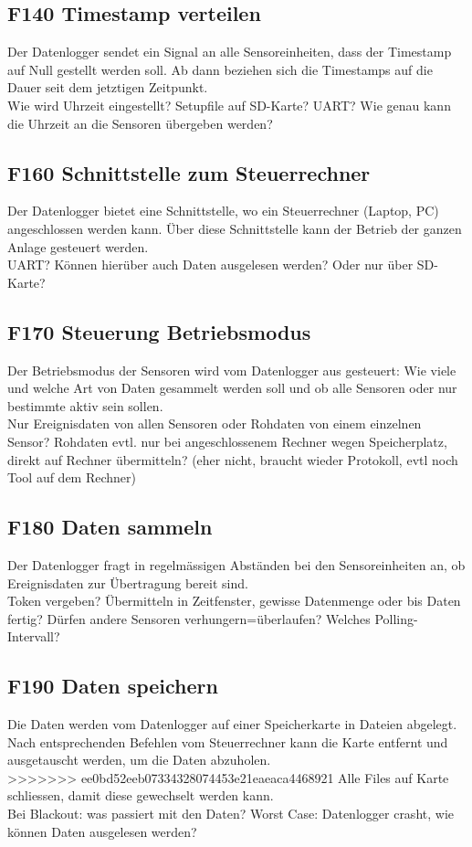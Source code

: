 \subsection{F140 Timestamp verteilen}
Der Datenlogger sendet ein Signal an alle Sensoreinheiten, dass der Timestamp auf Null gestellt werden soll. Ab dann beziehen sich die Timestamps auf die Dauer seit dem jetztigen Zeitpunkt.\\
Wie wird Uhrzeit eingestellt? Setupfile auf SD-Karte? UART? Wie genau kann die Uhrzeit an die Sensoren übergeben werden?

\subsection{F160 Schnittstelle zum Steuerrechner}
Der Datenlogger bietet eine Schnittstelle, wo ein Steuerrechner (Laptop, PC) angeschlossen werden kann. Über diese Schnittstelle kann der Betrieb der ganzen Anlage gesteuert werden.\\
 UART? Können hierüber auch Daten ausgelesen werden? Oder nur über SD-Karte?

\subsection{F170 Steuerung Betriebsmodus}
Der Betriebsmodus der Sensoren wird vom Datenlogger aus gesteuert: Wie viele und welche Art von Daten gesammelt werden soll und ob alle Sensoren oder nur bestimmte aktiv sein sollen. \\
Nur Ereignisdaten von allen Sensoren oder Rohdaten von einem einzelnen Sensor? Rohdaten evtl. nur bei angeschlossenem Rechner wegen Speicherplatz, direkt auf Rechner übermitteln? (eher nicht, braucht wieder Protokoll, evtl noch Tool auf dem Rechner)

\subsection{F180 Daten sammeln}
Der Datenlogger fragt in regelmässigen Abständen bei den Sensoreinheiten an, ob Ereignisdaten zur Übertragung bereit sind.\\
Token vergeben? Übermitteln in Zeitfenster, gewisse Datenmenge oder bis Daten fertig? Dürfen andere Sensoren verhungern=überlaufen? Welches Polling-Intervall?

\subsection{F190 Daten speichern}
Die Daten werden vom Datenlogger auf einer Speicherkarte in Dateien abgelegt. Nach entsprechenden Befehlen vom Steuerrechner kann die Karte entfernt und ausgetauscht werden, um die Daten abzuholen.\\
>>>>>>> ee0bd52eeb07334328074453e21eaeaca4468921
Alle Files auf Karte schliessen, damit diese gewechselt werden kann.\\
Bei Blackout: was passiert mit den Daten? Worst Case: Datenlogger crasht, wie können Daten ausgelesen werden?


